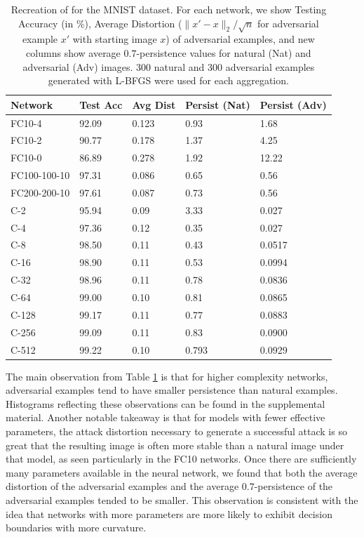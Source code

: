 \begin{table}[ht]
\centering
\caption{Recreation of \citet[Table 1]{szegedy2013} for the MNIST dataset.  For each network, we show Testing Accuracy (in \%), Average Distortion ($\|x'-x\|_2/\sqrt{n}$ for adversarial example $x'$ with starting image $x$) of adversarial examples, and new columns show average $0.7$-persistence values for natural (Nat) and adversarial (Adv) images. 300 natural and 300 adversarial examples generated with L-BFGS were used for each aggregation.}
\label{table1}
\begin{tabular}{lllll}
\toprule
Network & Test Acc & Avg Dist & Persist (Nat) & Persist (Adv) \\
\midrule
FC10-4 & 92.09 & 0.123 & 0.93 & 1.68\\
FC10-2 & 90.77 & 0.178 & 1.37 & 4.25\\
FC10-0 & 86.89 & 0.278 & 1.92 & 12.22\\
FC100-100-10 & 97.31 & 0.086 & 0.65 & 0.56 \\
FC200-200-10 & 97.61 & 0.087 & 0.73 & 0.56 \\
\midrule
C-2 & 95.94 & 0.09 & 3.33 & 0.027 \\
C-4 & 97.36 & 0.12 & 0.35 & 0.027 \\
C-8 & 98.50 & 0.11 & 0.43  & 0.0517 \\
C-16 & 98.90 & 0.11 & 0.53 & 0.0994 \\
C-32 & 98.96 & 0.11 & 0.78 & 0.0836 \\
C-64 & 99.00 & 0.10 & 0.81 & 0.0865 \\
C-128 & 99.17 & 0.11 & 0.77 & 0.0883 \\
C-256 & 99.09 & 0.11  & 0.83 & 0.0900 \\
C-512 & 99.22 & 0.10 & 0.793 & 0.0929 \\

\bottomrule
\end{tabular}
\end{table}

The main observation from Table \ref{table1} is that for higher complexity networks,
adversarial examples tend to have smaller persistence than natural examples. Histograms reflecting these observations can be found in the supplemental material. %
Another notable takeaway is that for models with fewer effective parameters, the attack distortion necessary to generate a successful attack is so great that the resulting image is often more stable than a natural image under that model, as seen particularly in the FC10 networks. Once there are sufficiently many parameters available in the neural network, we found that both the average distortion of the adversarial examples and the average $0.7$-persistence of the adversarial examples tended to be smaller. This observation is consistent with the idea that networks with more parameters are more likely to exhibit decision boundaries with more curvature.

